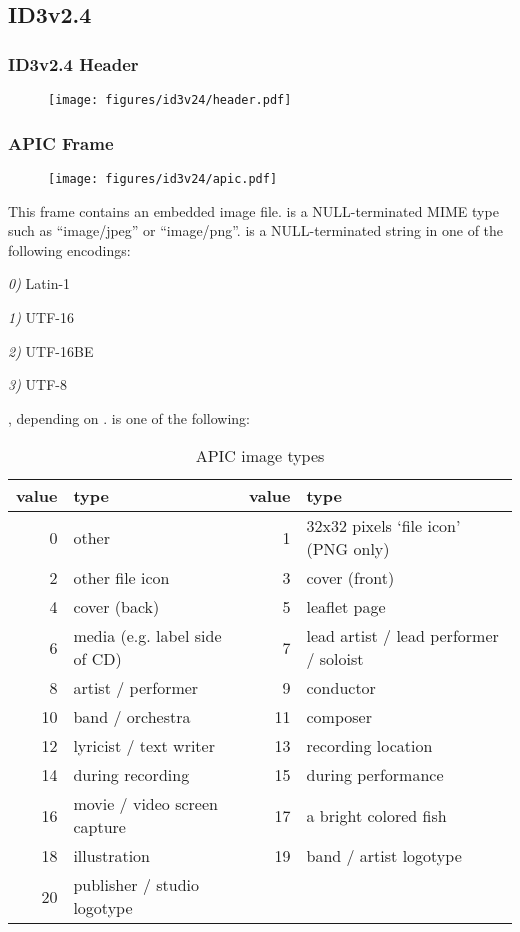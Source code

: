 \clearpage

\subsection{ID3v2.4}
\subsubsection{ID3v2.4 Header}
\begin{figure}[h]
\texttt{[image: figures/id3v24/header.pdf]}
\end{figure}

\subsubsection{APIC Frame}
\begin{figure}[h]
\texttt{[image: figures/id3v24/apic.pdf]}
\end{figure}
This frame contains an embedded image file.
 is a NULL-terminated MIME type such as ``image/jpeg''
or ``image/png''.
 is a NULL-terminated string
in one of the following encodings:
\begin{inparaenum}
\item[\itshape 0\upshape)] Latin-1
\item[\itshape 1\upshape)] UTF-16
\item[\itshape 2\upshape)] UTF-16BE
\item[\itshape 3\upshape)] UTF-8
\end{inparaenum}
, depending on .
 is one of the following:
\begin{table}[h]
{
\begin{tabular}{|r|l||r|l|}
\hline
value & type & value & type \\
\hline
0 & other & 1 & 32x32 pixels `file icon' (PNG only) \\
2 & other file icon & 3 & cover (front) \\
4 & cover (back) & 5 & leaflet page \\
6 & media (e.g. label side of CD) & 7 & lead artist / lead performer / soloist \\
8 & artist / performer & 9 & conductor \\
10 & band / orchestra & 11 & composer \\
12 & lyricist / text writer & 13 & recording location \\
14 & during recording & 15 & during performance \\
16 & movie / video screen capture & 17 & a bright colored fish \\
18 & illustration & 19 & band / artist logotype \\
20 & publisher / studio logotype & &  \\
\hline
\end{tabular}
\caption{APIC image types}
}
\end{table}

